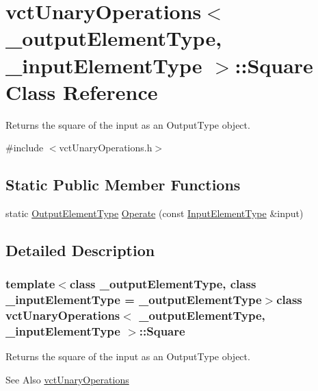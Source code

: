 \hypertarget{classvct_unary_operations_1_1_square}{\section{vct\-Unary\-Operations$<$ \-\_\-output\-Element\-Type, \-\_\-input\-Element\-Type $>$\-:\-:Square Class Reference}
\label{classvct_unary_operations_1_1_square}
}


Returns the square of the input as an Output\-Type object.  




{\ttfamily \#include $<$vct\-Unary\-Operations.\-h$>$}

\subsection*{Static Public Member Functions}
\begin{DoxyCompactItemize}
\item 
static \hyperlink{classvct_unary_operations_a42306ac3dd20d32c6d6c66ac3fa2e7b9}{Output\-Element\-Type} \hyperlink{classvct_unary_operations_1_1_square_a2896b836b2ee268259ca078cf2d907f5}{Operate} (const \hyperlink{classvct_unary_operations_abf3b77bb7b8abd7ba72a6a45a65696a7}{Input\-Element\-Type} \&input)
\end{DoxyCompactItemize}


\subsection{Detailed Description}
\subsubsection*{template$<$class \-\_\-output\-Element\-Type, class \-\_\-input\-Element\-Type = \-\_\-output\-Element\-Type$>$class vct\-Unary\-Operations$<$ \-\_\-output\-Element\-Type, \-\_\-input\-Element\-Type $>$\-::\-Square}

Returns the square of the input as an Output\-Type object. 

\begin{DoxySeeAlso}{See Also}
\hyperlink{classvct_unary_operations}{vct\-Unary\-Operations} 
\end{DoxySeeAlso}


